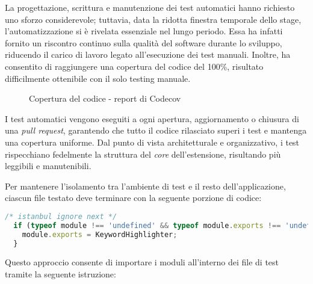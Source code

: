 \vspace{10pt}
\par\noindent La progettazione, scrittura e manutenzione dei test automatici hanno richiesto uno sforzo considerevole; tuttavia, data la ridotta finestra temporale dello stage, l’automatizzazione si è rivelata essenziale nel lungo periodo. Essa ha infatti fornito un riscontro continuo sulla qualità del software durante lo sviluppo, riducendo il carico di lavoro legato all’esecuzione dei test manuali. Inoltre, ha consentito di raggiungere una copertura del codice del 100\%, risultato difficilmente ottenibile con il solo testing manuale.

\begin{figure}[H]
  \centering 
  \caption{Copertura del codice - report di Codecov}
\end{figure}

\par\noindent I test automatici vengono eseguiti a ogni apertura, aggiornamento o chiusura di una \textit{pull request}, garantendo che tutto il codice rilasciato superi i test e mantenga una copertura uniforme. Dal punto di vista architetturale e organizzativo, i test rispecchiano fedelmente la struttura del \textit{core} dell’estensione, risultando più leggibili e manutenibili. 

\vspace{10pt}
\begin{samepage}
\end{samepage}

\vspace{10pt}
\par\noindent Per mantenere l’isolamento tra l’ambiente di test e il resto dell’applicazione, ciascun file testato deve terminare con la seguente porzione di codice:

\vspace{10pt}
\begin{samepage}
\begin{lstlisting}[language=JavaScript]
  /* istanbul ignore next */
  if (typeof module !== 'undefined' && typeof module.exports !== 'undefined') {
    module.exports = KeywordHighlighter;
  }
\end{lstlisting}
\end{samepage}

\vspace{10pt}
\par\noindent Questo approccio consente di importare i moduli all’interno dei file di test tramite la seguente istruzione:

